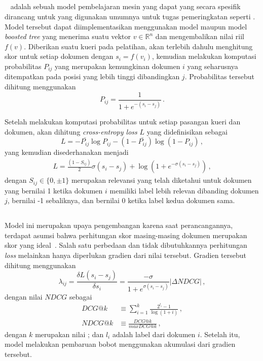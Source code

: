 \subsection{\ranknet{}}
\label{subbab:2:RankNet}
\ranknet{}~\citep{burges2010ranknet} adalah sebuah model pembelajaran mesin yang dapat  yang secara spesifik dirancang untuk \ltr{} yang digunakan umumnya untuk tugas pemeringkatan seperti \ir{}. Model tersebut dapat diimplementasikan menggunakan model \nn{} maupun model \textit{boosted tree} yang menerima suatu vektor $v \in{} \mathbb{R}^n$ dan mengembalikan nilai riil $f(v)$. Diberikan suatu kueri pada pelatihan, \ranknet{} akan terlebih dahulu menghitung skor untuk setiap dokumen dengan $s_{i}=f(v_{i})$, kemudian melakukan komputasi probabilitas $P_{ij}$ yang merupakan kemungkinan dokumen $i$ yang seharusnya ditempatkan pada posisi yang lebih tinggi dibandingkan $j$. Probabilitas tersebut dihitung menggunakan
\[
P_{ij} = \frac{1}{1+e^{-(s_i-s_j)}} \, .
\]

Setelah melakukan komputasi probabilitas untuk setiap pasangan kueri dan dokumen, akan dihitung \textit{cross-entropy loss} $L$ yang didefinisikan sebagai
\[
L=-\bar{P_{ij}}\log{P_{ij}}-(1-\bar{P_{ij}})\log(1-P_{ij}) \, ,
\]
yang kemudian disederhanakan menjadi 
\begin{align*}
L=\frac{(1-S_{ij})}{2}\sigma{}(s_i-s_j)+\log{}(1+e^{-\sigma{}(s_i-s_j)}) \, ,
\end{align*}
dengan $S_{ij}\in{}\{0,\pm{}1\}$ merupakan relevansi yang telah diketahui untuk dokumen yang bernilai 1 ketika dokumen $i$ memiliki label lebih relevan dibanding dokumen $j$, bernilai -1 sebaliknya, dan bernilai 0 ketika label kedua dokumen sama.

\subsection{\lambdarank{}}
\label{subbab:2:LambdaRank}
Model ini merupakan upaya pengembangan \ranknet{} karena saat perancangannya, terdapat asumsi bahwa perhitungan skor masing-masing dokumen merupakan skor yang ideal~\citep{burges2010ranknet}. Salah satu perbedaan \lambdarank{} dan \ranknet{} tidak dibutuhkannya perhitungan \textit{loss} melainkan hanya diperlukan gradien dari nilai tersebut. Gradien tersebut dihitung menggunakan
\[
\lambda_{ij}=\frac{\delta{}L(s_i-s_j)}{\delta{}s_i}=\frac{-\sigma{}}{1+e^{\sigma{}(s_i-s_j)}}|\Delta{}NDCG| \, ,
\]
dengan nilai $NDCG$ sebagai
\begin{align*}
DCG@k&\equiv{}\sum^k_{i=1} \frac{2^{l_i}-1}{\log(1+i)} \, ,\\
NDCG@k&\equiv{}\frac{DCG@k}{maxDCG@k} \, ,
\end{align*}
dengan $k$ merupakan nilai \cutoff{}; dan $l_i$ adalah label dari dokumen $i$. Setelah itu, model melakukan pembaruan bobot menggunakan akumulasi dari gradien tersebut.


